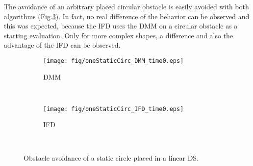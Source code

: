 The avoidance of an arbitrary placed circular obstacle is easily avoided with both algorithms (Fig.\ref{fig:static_circle}). In fact, no real difference of the behavior can be observed and this was expected, because the IFD uses the DMM on a circular obstacle as a starting evaluation. Only for more complex shapes, a difference and also the advantage of the IFD can be observed.
\begin{figure}[tb]\centering
\begin{subfigure}{.48\columnwidth} %
\centering
\texttt{[image: fig/oneStaticCirc\_DMM\_time0.eps]}
\caption{DMM}
\label{fig:oneStaticCirc_DMM}
\end{subfigure}\,\, %
\begin{subfigure}{.48\columnwidth} %
\centering
\texttt{[image: fig/oneStaticCirc\_IFD\_time0.eps]}
\caption{IFD}
\label{fig:oneStaticCirc_IFD}
\end{subfigure}\,\, %
\caption{Obstacle avoidance of a static circle placed in a linear DS.}
\label{fig:static_circle}
\end{figure}




